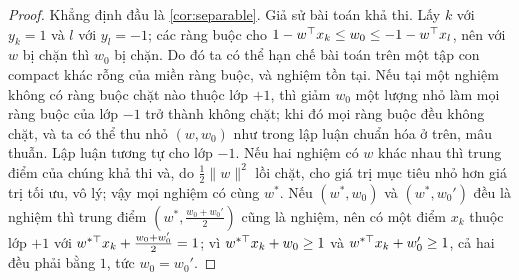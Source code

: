 \begin{proof}
Khẳng định đầu là \cref{cor:separable}. Giả sử bài toán khả thi. Lấy $k$ với $y_k=1$ và $l$ với $y_l=-1$; các ràng buộc cho $1-w^\top x_k\le w_0\le-1-w^\top x_l$, nên với $w$ bị chặn thì $w_0$ bị chặn. Do đó ta có thể hạn chế bài toán trên một tập con compact khác rỗng của miền ràng buộc, và nghiệm tồn tại. Nếu tại một nghiệm không có ràng buộc chặt nào thuộc lớp $+1$, thì giảm $w_0$ một lượng nhỏ làm mọi ràng buộc của lớp $-1$ trở thành không chặt; khi đó mọi ràng buộc đều không chặt, và ta có thể thu nhỏ $(w,w_0)$ như trong lập luận chuẩn hóa ở trên, mâu thuẫn. Lập luận tương tự cho lớp $-1$. Nếu hai nghiệm có $w$ khác nhau thì trung điểm của chúng khả thi và, do $\frac12\|w\|^2$ lồi chặt, cho giá trị mục tiêu nhỏ hơn giá trị tối ưu, vô lý; vậy mọi nghiệm có cùng $w^\ast$. Nếu $(w^\ast,w_0)$ và $(w^\ast,w_0')$ đều là nghiệm thì trung điểm $(w^\ast,\frac{w_0+w_0'}2)$ cũng là nghiệm, nên có một điểm $x_k$ thuộc lớp $+1$ với $w^{\ast\top}x_k+\frac{w_0+w_0'}2=1$; vì $w^{\ast\top}x_k+w_0\ge1$ và $w^{\ast\top}x_k+w_0'\ge1$, cả hai đều phải bằng $1$, tức $w_0=w_0'$.
\end{proof}

